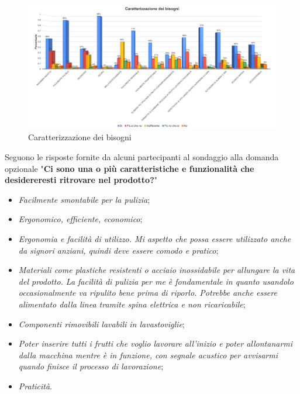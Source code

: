\documentclass[12pt,a4paper,twoside]{report}  %
\begin{document}
\newpage

\begin{landscape}
\begin{figure}
    \centering
    \includegraphics[width=1\linewidth]{caratterizzazioneBisogni.png}
    \caption{Caratterizzazione dei bisogni}
    \label{fig:caratterizzazioneBisogni}
\end{figure}
\end{landscape}

\newpage
Seguono le risposte fornite da alcuni partecipanti al sondaggio alla domanda opzionale "\textbf{Ci sono una o più caratteristiche e funzionalità che desidereresti ritrovare nel prodotto?}"
\begin{itemize}
\item \textit{Facilmente smontabile per la pulizia};
\item \textit{Ergonomico, efficiente, economico};
\item \textit{Ergonomia e facilità di utilizzo. Mi aspetto che possa essere utilizzato anche da signori anziani, quindi deve essere comodo e pratico};
\item \textit{Materiali come plastiche resistenti o acciaio inossidabile per allungare la vita del prodotto. La facilità di pulizia per me è fondamentale in quanto usandolo occasionalmente va ripulito bene prima di riporlo. Potrebbe anche essere alimentato dalla linea tramite spina elettrica e non ricaricabile};
\item \textit{Componenti rimovibili lavabili in lavastoviglie};
\item \textit{Poter inserire tutti i frutti che voglio lavorare all’inizio e poter allontanarmi dalla macchina mentre è in funzione, con segnale acustico per avvisarmi quando finisce il processo di lavorazione};
\item \textit{Praticità}.
\end{itemize}
\end{document}
